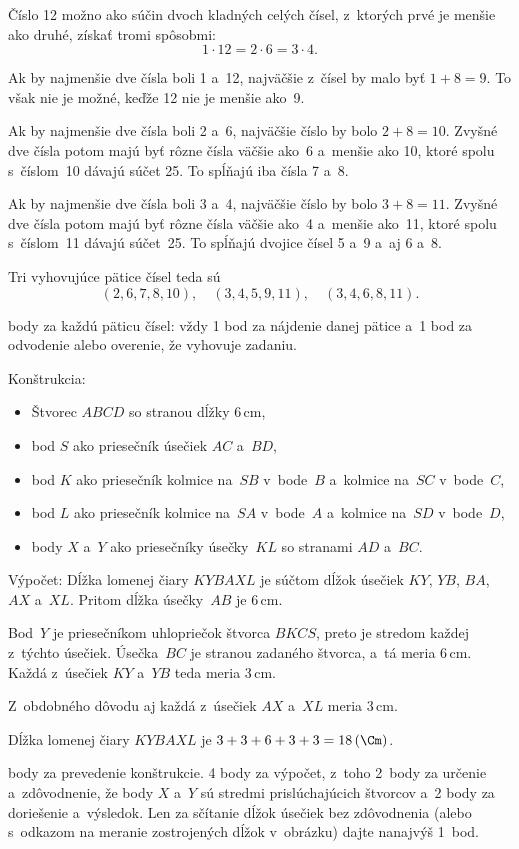 {%
Číslo 12 možno ako súčin dvoch kladných celých čísel, z~ktorých prvé je menšie ako druhé, získať tromi spôsobmi:
$$
1\cdot12=2\cdot6=3\cdot4.
$$

Ak by najmenšie dve čísla boli 1 a~12, najväčšie z~čísel by malo byť $1+8=9$.
To však nie je možné, keďže 12 nie je menšie ako~9.

Ak by najmenšie dve čísla boli 2 a~6, najväčšie číslo by bolo $2+8=10$.
Zvyšné dve čísla potom majú byť rôzne čísla väčšie ako~6 a~menšie ako 10, ktoré spolu s~číslom~10 dávajú súčet 25.
To spĺňajú iba čísla 7 a~8.

Ak by najmenšie dve čísla boli 3 a~4, najväčšie číslo by bolo $3+8=11$.
Zvyšné dve čísla potom majú byť rôzne čísla väčšie ako~4 a~menšie ako~11, ktoré spolu s~číslom~11 dávajú súčet~25.
To spĺňajú dvojice čísel 5 a~9 a~aj 6 a~8.

Tri vyhovujúce pätice čísel teda sú
$$
(2, 6, 7, 8, 10),\quad (3, 4, 5, 9, 11),\quad (3, 4, 6, 8, 11).
$$

 body za každú päticu čísel: vždy 1 bod za nájdenie danej pätice a~1 bod za odvodenie alebo overenie, že vyhovuje zadaniu.
\endhodnotenie
}

{%
Konštrukcia:
\begin{itemize}
\item Štvorec $ABCD$ so stranou dĺžky 6\,cm,
\item bod $S$ ako priesečník úsečiek $AC$ a~$BD$,
\item bod $K$ ako priesečník kolmice na~$SB$ v~bode~$B$ a~kolmice na~$SC$ v~bode~$C$,
\item bod $L$ ako priesečník kolmice na~$SA$ v~bode~$A$ a~kolmice na~$SD$ v~bode~$D$,
\item body $X$ a~$Y$ ako priesečníky úsečky~$KL$ so stranami $AD$ a~$BC$.
\end{itemize}

Výpočet:
Dĺžka lomenej čiary $KYBAXL$ je súčtom dĺžok úsečiek $KY$, $YB$, $BA$, $AX$ a~$XL$.
Pritom dĺžka úsečky~$AB$ je 6\,cm.

Bod~$Y$ je priesečníkom uhlopriečok štvorca $BKCS$, preto je stredom každej z~týchto úsečiek.
Úsečka~$BC$ je stranou zadaného štvorca, a~tá meria 6\,cm.
Každá z~úsečiek $KY$ a~$YB$ teda meria 3\,cm.

Z~obdobného dôvodu aj každá z~úsečiek $AX$ a~$XL$ meria 3\,cm.

Dĺžka lomenej čiary $KYBAXL$ je
$3+3+6+3+3= 18\,(\Cm)$.
%

 body za prevedenie konštrukcie.
4 body za výpočet, z~toho
2~body za určenie a~zdôvodnenie, že body $X$ a~$Y$ sú stredmi prislúchajúcich štvorcov a~2 body za doriešenie a~výsledok.
Len za sčítanie dĺžok úsečiek bez zdôvodnenia (alebo s~odkazom na meranie zostrojených dĺžok v~obrázku) dajte nanajvýš 1~bod.
\endhodnotenie
}

